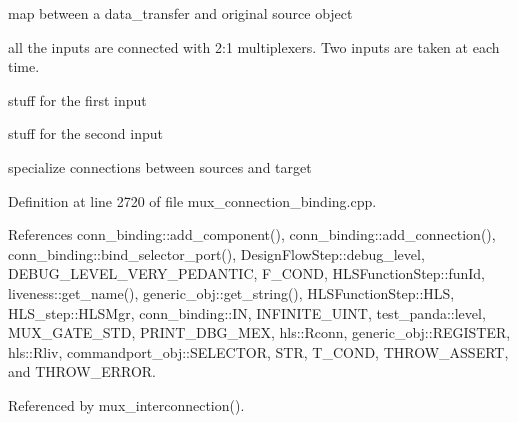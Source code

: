 map between a data\+\_\+transfer and original source object

all the inputs are connected with 2\+:1 multiplexers. Two inputs are taken at each time.

stuff for the first input

stuff for the second input

specialize connections between sources and target 

Definition at line 2720 of file mux\+\_\+connection\+\_\+binding.\+cpp.



References conn\+\_\+binding\+::add\+\_\+component(), conn\+\_\+binding\+::add\+\_\+connection(), conn\+\_\+binding\+::bind\+\_\+selector\+\_\+port(), Design\+Flow\+Step\+::debug\+\_\+level, D\+E\+B\+U\+G\+\_\+\+L\+E\+V\+E\+L\+\_\+\+V\+E\+R\+Y\+\_\+\+P\+E\+D\+A\+N\+T\+IC, F\+\_\+\+C\+O\+ND, H\+L\+S\+Function\+Step\+::fun\+Id, liveness\+::get\+\_\+name(), generic\+\_\+obj\+::get\+\_\+string(), H\+L\+S\+Function\+Step\+::\+H\+LS, H\+L\+S\+\_\+step\+::\+H\+L\+S\+Mgr, conn\+\_\+binding\+::\+IN, I\+N\+F\+I\+N\+I\+T\+E\+\_\+\+U\+I\+NT, test\+\_\+panda\+::level, M\+U\+X\+\_\+\+G\+A\+T\+E\+\_\+\+S\+TD, P\+R\+I\+N\+T\+\_\+\+D\+B\+G\+\_\+\+M\+EX, hls\+::\+Rconn, generic\+\_\+obj\+::\+R\+E\+G\+I\+S\+T\+ER, hls\+::\+Rliv, commandport\+\_\+obj\+::\+S\+E\+L\+E\+C\+T\+OR, S\+TR, T\+\_\+\+C\+O\+ND, T\+H\+R\+O\+W\+\_\+\+A\+S\+S\+E\+RT, and T\+H\+R\+O\+W\+\_\+\+E\+R\+R\+OR.



Referenced by mux\+\_\+interconnection().

